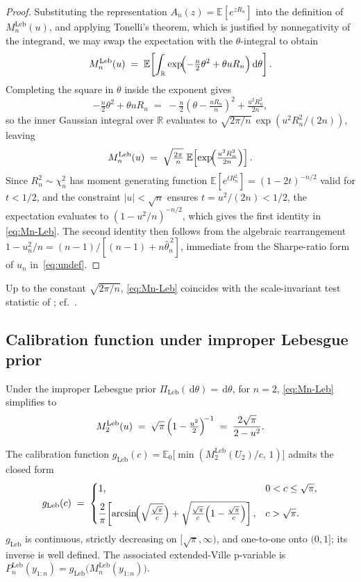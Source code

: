 \documentclass[12pt, a4paper]{report}
\newcommand{\E}{\mathbb{E}}
\newcommand{\dd}{\,\mathrm{d}}
\newcommand{\Leb}{\mathrm{Leb}}
\newcommand{\1}{\mathbf{1}}
\begin{document}
\begin{proof}
Substituting the representation $A_n(z) = \E[e^{zR_n}]$ into the definition of $M_n^{\Leb}(u)$, and applying Tonelli's theorem, which is justified by nonnegativity of the integrand, we may swap the expectation with the $\theta$-integral to obtain
\[
  M_n^{\Leb}(u) \;=\; \E\!\left[\int_\mathbb{R} \exp\!\Bigl(-\tfrac n2\theta^2 + \theta u R_n\Bigr)\dd\theta\right].
\]
Completing the square in $\theta$ inside the exponent gives
\[
  -\tfrac n2\theta^2 + \theta u R_n
  \;=\; -\tfrac n2\!\left(\theta - \tfrac{u R_n}{n}\right)^{\!2}
  + \tfrac{u^2 R_n^2}{2n},
\]
so the inner Gaussian integral over $\mathbb{R}$ evaluates to
$\sqrt{2\pi/n}\,\exp(u^2 R_n^2/(2n))$, leaving
\[
  M_n^{\Leb}(u)
  \;=\; \sqrt{\tfrac{2\pi}{n}}\;
  \E\!\left[\exp\!\Bigl(\tfrac{u^2 R_n^2}{2n}\Bigr)\right].
\]
Since $R_n^2 \sim \chi_n^2$ has moment generating function
$\E[e^{t R_n^2}] = (1-2t)^{-n/2}$ valid for $t<1/2$, and the constraint
$|u|<\sqrt n$ ensures $t = u^2/(2n) < 1/2$, the expectation evaluates to
$(1 - u^2/n)^{-n/2}$, which gives the first identity in \eqref{eq:Mn-Leb}. The second identity then follows from the algebraic
rearrangement $1 - u_n^2/n = (n-1)/[(n-1) + n\widehat\theta_n^{\,2}]$,
immediate from the Sharpe-ratio form of $u_n$ in~\eqref{eq:undef}.
\end{proof}

Up to the constant \(\sqrt{2\pi/n}\), \eqref{eq:Mn-Leb} coincides with the scale-invariant test statistic of \cite[Theorem 2]{Lai1976}; cf.\
\cite[Theorem 4.1]{Wang2025}.

\subsection{Calibration function under improper Lebesgue prior}\label{sec:Leb_cal}

Under the improper Lebesgue prior \(\Pi_{\Leb}(\dd\theta)=\dd\theta\), for \(n=2\), \eqref{eq:Mn-Leb} simplifies to
\begin{equation}\label{eq:M2-Leb}
   M_2^{\Leb}(u)\;=\;\sqrt{\pi}\,\Bigl(1-\tfrac{u^2}{2}\Bigr)^{\!-1}
   \;=\;\frac{2\sqrt\pi}{2-u^2}.
\end{equation}

\begin{theorem}\label{thm:gLeb}
The calibration function
\(g_{\Leb}(c)=\E_0\bigl[\min(M_2^{\Leb}(U_2)/c,\,1)\bigr]\)
admits the closed form
\begin{equation}\label{eq:gLeb}
  g_{\Leb}(c)
  \;=\;
  \begin{cases}
   1, & 0<c\leq\sqrt\pi,\\[6pt]
   \dfrac{2}{\pi}\!\left[
     \arcsin\!\Bigl(\sqrt{\tfrac{\sqrt\pi}{c}}\Bigr)
     +\sqrt{\tfrac{\sqrt\pi}{c}\Bigl(1-\tfrac{\sqrt\pi}{c}\Bigr)}\right],
   & c>\sqrt\pi.
  \end{cases}
\end{equation}
\(g_{\Leb}\) is continuous, strictly decreasing on \([\sqrt\pi,\infty)\),
and one-to-one onto \((0,1]\); its inverse is well defined.
The associated extended-Ville p-variable is
\(P_n^{\Leb}(y_{1:n})=g_{\Leb}\bigl(M_n^{\Leb}(y_{1:n})\bigr)\).
\end{theorem}
\end{document}
